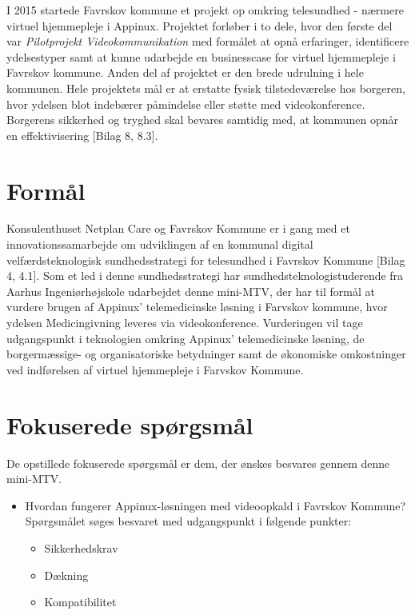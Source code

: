 I 2015 startede Favrskov kommune et projekt op omkring telesundhed - nærmere virtuel hjemmepleje i Appinux. Projektet forløber i to dele, hvor den første del var \textit{Pilotprojekt Videokommunikation} med formålet at opnå erfaringer, identificere ydelsestyper samt at kunne udarbejde en businesscase for virtuel hjemmepleje i Favrskov kommune. Anden del af projektet er den brede udrulning i hele kommunen. Hele projektets mål er at erstatte fysisk tilstedeværelse hos borgeren, hvor ydelsen blot indebærer påmindelse eller støtte med videokonference. Borgerens sikkerhed og tryghed skal bevares samtidig med, at kommunen opnår en effektivisering [Bilag 8, 8.3]. 

\section{Formål}
Konsulenthuset Netplan Care og Favrskov Kommune er i gang med et innovationssamarbejde om udviklingen af en kommunal digital velfærdsteknologisk sundhedsstrategi for telesundhed i Favrskov Kommune [Bilag 4, 4.1]. Som et led i denne sundhedsstrategi har sundhedsteknologistuderende fra Aarhus Ingeniørhøjskole udarbejdet denne mini-MTV, der har til formål at vurdere brugen af Appinux' telemedicinske løsning i Farvskov kommune, hvor ydelsen Medicingivning 
 leveres via videokonference. Vurderingen vil tage udgangspunkt i teknologien omkring Appinux' telemedicinske løsning, de borgermæssige- og organisatoriske betydninger samt de økonomiske omkostninger ved indførelsen af virtuel hjemmepleje i Farvskov Kommune.  

\section{Fokuserede spørgsmål}
De opstillede fokuserede spørgsmål er dem, der ønskes besvares gennem denne mini-MTV. 

\begin{itemize}
	\item Hvordan fungerer Appinux-løsningen med videoopkald i Favrskov Kommune? \\Spørgsmålet søges besvaret med udgangspunkt i følgende punkter:
	\begin{itemize}
	\item Sikkerhedskrav
	\item Dækning %
	\item Kompatibilitet 
\end{itemize}
\end{itemize}

